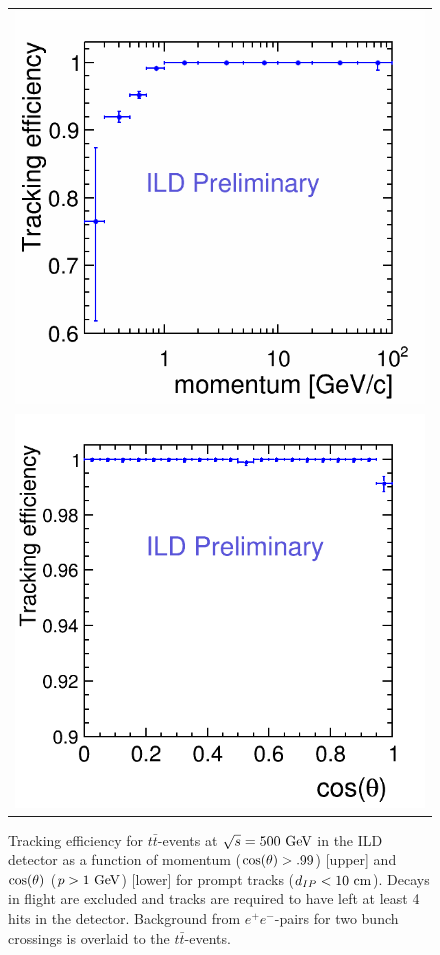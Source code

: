 \begin{figure}
  \begin{tabular}[c]{c}
    \includegraphics[width=0.85\hsize]{chapters/figures/trkEff_Momentum_ttbar_ILD_l5_v02_v02-00-02_New_wPairsOverlay_2BX_publish_cuts2.png} \\
    \includegraphics[width=0.85\hsize]{chapters/figures/trkEff_theta_ttbar_ILD_l5_v02_v02-00-02_New_wPairsOverlay_2BX_publish_cuts1.png}
\end{tabular}
  \caption{Tracking efficiency for $t\bar t$-events at $\sqrt{s}=500~\rm{GeV}$ in the ILD detector as a function of
    momentum ($\rm{cos}(\theta)>.99$) [upper] and $\rm{cos}(\theta)$ ($p>1~\rm{GeV}$) [lower] for prompt tracks
    ($d_{IP}<10~\rm{cm}$). Decays in flight are excluded and tracks are required to have left at least 4 hits in the detector.
  Background from $e^+e^-$-pairs for two bunch crossings is overlaid to the $t\bar t$-events.}

\label{fig:ild_trkeff}
\end{figure}
